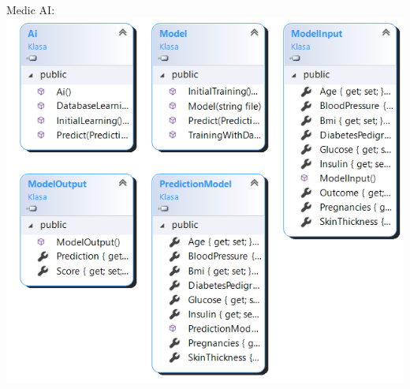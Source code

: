 \documentclass[12pt,a4paper]{article}
\begin{document}
Medic AI: \newline
\includegraphics[scale=0.6]{diagram4.png}
\end{document}
